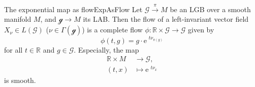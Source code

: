 \documentclass[reqno,a4paper,oneside]{amsart}
\newcommand{\e}{\ensuremath{\mathrm{e\;\!}}}
\theoremstyle{plain}
\theoremstyle{remark}
\theoremstyle{definition}
\def\bas#1\eas{\begin{align*}#1\end{align*}}
\begin{document}
\begin{corollaries}{The exponential map as flow}{ExpAsFlow}
Let $\mathcal{G} \stackrel{\pi}{\to} M$ be an LGB over a smooth manifold $M$, and $\mathcal{g} \to M$ its LAB. Then the flow of a left-invariant vector field $X_\nu \in L(\mathcal{G})$ ($\nu \in \Gamma(\mathcal{g})$) is a complete flow $\phi: \mathbb{R} \times \mathcal{G} \to \mathcal{G}$ given by
\begin{equation*}
\phi(t, g)
=
g \cdot \e^{t \nu_{\pi(g)}}
\end{equation*}
for all $t \in \mathbb{R}$ and $g \in \mathcal{G}$. 
Especially, the map
\begin{align*}
\mathbb{R} \times M &\to \mathcal{G},\\
(t, x) &\mapsto \e^{t\nu_x}
\end{align*}
is smooth.
\end{corollaries}
%
\end{document}
